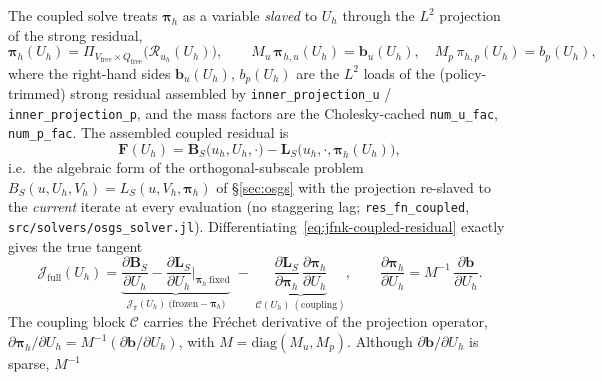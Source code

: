 \documentclass{article}
\newcommand{\code}[1]{\texttt{\small #1}}
\begin{document}
The coupled solve treats $\boldsymbol{\pi}_h$ as a variable
\emph{slaved} to $U_h$ through the $L^2$ projection of the strong
residual,
\begin{equation}
    \label{eq:jfnk-slaved-pi}
    \boldsymbol{\pi}_h(U_h)
        = \Pi_{V_{\mathrm{free}}\times Q_{\mathrm{free}}}
            \bigl(\mathcal{R}_{u_h}(U_h)\bigr),
    \qquad
    M_u\,\boldsymbol{\pi}_{h,u}(U_h) = \boldsymbol{b}_u(U_h),
    \quad
    M_p\,\pi_{h,p}(U_h) = b_p(U_h),
\end{equation}
where the right-hand sides $\boldsymbol{b}_u(U_h)$, $b_p(U_h)$ are the
$L^2$ loads of the (policy-trimmed) strong residual assembled by
\code{inner\_projection\_u} / \code{inner\_projection\_p}, and the mass
factors are the Cholesky-cached \code{num\_u\_fac}, \code{num\_p\_fac}.
The assembled coupled residual is
\begin{equation}
    \label{eq:jfnk-coupled-residual}
    \boldsymbol{F}(U_h)
        = \boldsymbol{B}_S\!\bigl(u_h, U_h, \cdot\bigr)
        - \boldsymbol{L}_S\!\bigl(u_h, \cdot, \boldsymbol{\pi}_h(U_h)\bigr),
\end{equation}
i.e.\ the algebraic form of the orthogonal-subscale problem
$B_S(u, U_h, V_h) = L_S(u, V_h, \boldsymbol{\pi}_h)$ of §\ref{sec:osgs}
with the projection re-slaved to the \emph{current} iterate at every
evaluation (no staggering lag; \code{res\_fn\_coupled},
\code{src/solvers/osgs\_solver.jl}).
Differentiating~\eqref{eq:jfnk-coupled-residual} exactly gives the true
tangent
\begin{equation}
    \label{eq:jfnk-true-tangent}
    \mathcal{J}_{\mathrm{full}}(U_h)
        = \underbrace{\frac{\partial \boldsymbol{B}_S}{\partial U_h}
            - \frac{\partial \boldsymbol{L}_S}{\partial U_h}
            \Bigg|_{\boldsymbol{\pi}_h\ \mathrm{fixed}}}_{
            \displaystyle \mathcal{J}_{\bar\pi}(U_h)\ \mathrm{(frozen-}\boldsymbol{\pi}_h\mathrm{)}}
        \;-\;
        \underbrace{\frac{\partial \boldsymbol{L}_S}{\partial \boldsymbol{\pi}_h}
            \,\frac{\partial \boldsymbol{\pi}_h}{\partial U_h}}_{
            \displaystyle \mathcal{C}(U_h)\ \mathrm{(coupling)}},
    \qquad
    \frac{\partial \boldsymbol{\pi}_h}{\partial U_h}
        = M^{-1}\,\frac{\partial \boldsymbol{b}}{\partial U_h}.
\end{equation}
The coupling block $\mathcal{C}$ carries the Fr\'echet derivative of the
projection operator, $\partial\boldsymbol{\pi}_h/\partial U_h = M^{-1}
(\partial\boldsymbol{b}/\partial U_h)$, with $M = \mathrm{diag}(M_u,
M_p)$. Although $\partial\boldsymbol{b}/\partial U_h$ is sparse, $M^{-1}$
\end{document}
